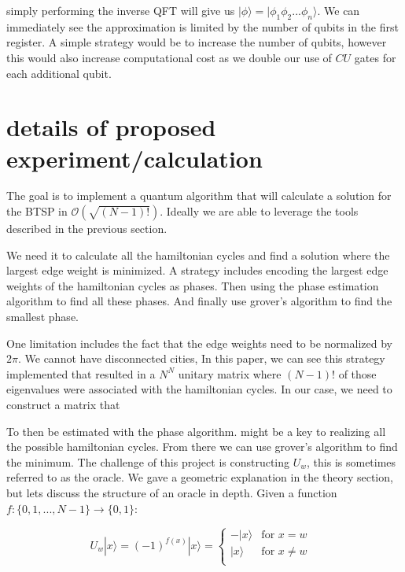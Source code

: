 \documentclass[twocolumn,showpacs,preprintnumbers,amsmath,amssymb]{revtex4}
\begin{document}
		simply performing the inverse QFT will give us $|\phi\rangle =  |\phi_1\phi_2 ... \phi_n\rangle$.  We can immediately see the approximation is limited by the number of qubits in the first register. A simple strategy would be to increase the number of qubits, however this would also increase computational cost as we double our use of $CU$ gates for each additional qubit.
		
		
		
		
		
		
		\section{details of proposed experiment/calculation}
		
		The goal is to implement a quantum algorithm that will calculate a solution for the BTSP in $\mathcal{O}(\sqrt{(N-1)!})$. Ideally we are able to leverage the tools described in the previous section. 
		
		We need it to calculate all the hamiltonian cycles and find a solution where the largest edge weight is minimized. A strategy includes encoding the largest edge weights of the hamiltonian cycles as phases. Then using the phase estimation algorithm to find all these phases. And finally use grover's algorithm to find the smallest phase.
		
		One limitation includes the fact that the edge weights need to be normalized by $2\pi$.  We cannot have disconnected cities, 
		In this paper, we can see this strategy implemented that resulted in a $N^N$ unitary matrix where $(N-1)!$ of those eigenvalues were associated with the hamiltonian cycles. In our case, we need to construct a matrix that 
		
		 To then be estimated with the phase algorithm.  might be a key to realizing all the possible hamiltonian cycles. From there we can use grover's algorithm to find the minimum. The challenge of this project is constructing $U_w$, this is sometimes referred to as the oracle. We gave a geometric explanation in the theory section, but lets discuss the structure of an oracle in depth. Given a function $f: \{0,1,...,N-1\} \rightarrow \{0,1\}$:
		
		\begin{equation}
			U_{w}|x\rangle = (-1)^{f(x)}|x\rangle = 
			\begin{cases}
				-|x\rangle & \text{for  $x=w$ }\\
				|x\rangle  & \text{for $x\neq w$}\\
			\end{cases}       
		\end{equation}
		
\end{document}
